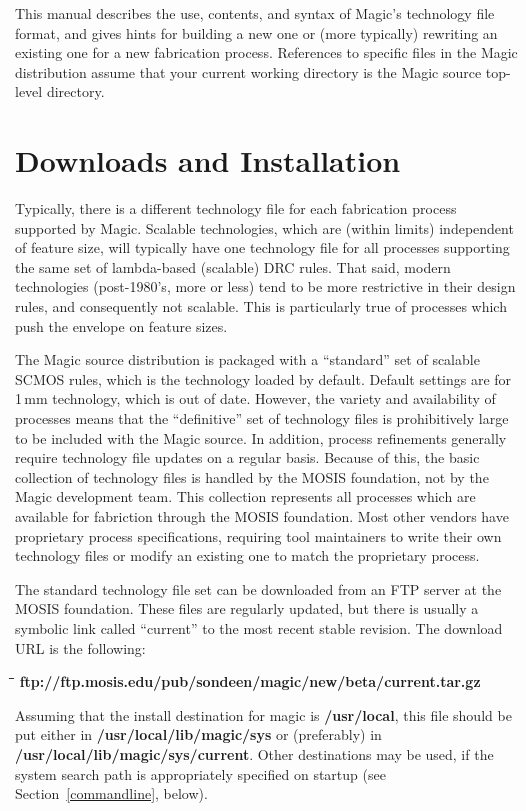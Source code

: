 \documentclass[letterpaper,twoside,12pt]{article}
\def\hinch{\hspace*{0.5in}}
\def\starti{\begin{center}\begin{tabbing}\hinch\=\hinch\=\hinch\=\hinch\=\kill}
\def\endi{\end{tabbing}\end{center}}
\newcommand{\micro}{\Pifont{psy}m}
\begin{document}
This manual describes the use, contents, and syntax of Magic's
technology file format, and gives hints for building a new one or
(more typically) rewriting an existing one for a new fabrication
process.  References to specific files in the Magic distribution
assume that your current working directory is the Magic source
top-level directory.

\section{Downloads and Installation}

Typically, there is a different technology file for each fabrication
process supported by Magic.  Scalable technologies, which are
(within limits) independent of feature size, will typically have
one technology file for all processes supporting the same set of
lambda-based (scalable) DRC rules.
That said, modern technologies (post-1980's, more or less) tend to
be more restrictive in their design rules, and consequently not
scalable.  This is particularly true of processes which push the
envelope on feature sizes.  

The Magic source distribution
is packaged with a ``standard'' set of scalable SCMOS rules, which
is the technology loaded by default.  Default settings are for
1\,{\micro}m technology, which is out of date.  However, the
variety and availability of processes means that the ``definitive''
set of technology files is prohibitively large to be included
with the Magic source.  In addition, process refinements generally
require technology file updates on a regular basis.  Because of
this, the basic collection of technology files is handled by the
MOSIS foundation, not by the Magic development team.  This
collection represents all processes which are available for
fabriction through the MOSIS foundation.  Most other vendors have
proprietary process specifications, requiring tool maintainers to
write their own technology files or modify an existing one to
match the proprietary process.

The standard technology file set can be downloaded from an FTP
server at the MOSIS foundation.  These files are regularly
updated, but there is usually a symbolic link called ``current''
to the most recent stable revision.  The download URL is the
following:

\starti
  \> {\ttfamily\bfseries ftp://ftp.mosis.edu/pub/sondeen/magic/new/beta/current.tar.gz}
\endi

Assuming that the install destination for magic is
{\bfseries /usr/local}, this file should be put either in {\bfseries
/usr/local/lib/magic/sys} or (preferably) in {\bfseries
/usr/local/lib/magic/sys/current}.  Other destinations may
be used, if the system search path is appropriately specified
on startup (see Section~\ref{commandline}, below).
\end{document}
